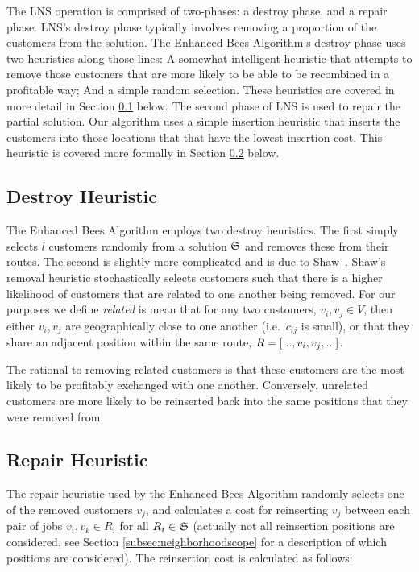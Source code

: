 The LNS operation is comprised of two-phases: a destroy phase, and a repair phase. LNS's destroy phase typically involves removing a proportion of the customers from the solution. The Enhanced Bees Algorithm's destroy phase uses two heuristics along those lines: A somewhat intelligent heuristic that attempts to remove those customers that are more likely to be able to be recombined in a profitable way; And a simple random selection. These heuristics are covered in more detail in Section \ref{subsec:destroyheuristic} below. The second phase of LNS is used to repair the partial solution. Our algorithm uses a simple insertion heuristic that inserts the customers into those locations that that have the lowest insertion cost. This heuristic is covered more formally in Section \ref{subsec:repairheuristic} below.

\subsection{Destroy Heuristic}
\label{subsec:destroyheuristic}

The Enhanced Bees Algorithm employs two destroy heuristics. The first simply selects $l$ customers randomly from a solution $\mathfrak{S}$ and removes these from their routes. The second is slightly more complicated and is due to Shaw~\cite{Shaw:1998}. Shaw's removal heuristic stochastically selects customers such that there is a higher likelihood of customers that are related to one another being removed. For our purposes we define \emph{related} is mean that for any two customers, $v_i, v_j \in V$, then either $v_i, v_j$ are geographically close to one another (i.e.~$c_{ij}$ is small), or that they share an adjacent position within the same route, $R = [..., v_i, v_j, ...]$.

The rational to removing related customers is that these customers are the most likely to be profitably exchanged with one another. Conversely, unrelated customers are more likely to be reinserted back into the same positions that they were removed from. 

\subsection{Repair Heuristic}
\label{subsec:repairheuristic}

The repair heuristic used by the Enhanced Bees Algorithm randomly selects one of the removed customers $v_j$, and calculates a cost for reinserting $v_j$ between each pair of jobs $v_i, v_k \in R_i$ for all $R_i \in \mathfrak{S}$ (actually not all reinsertion positions are considered, see Section \ref{subsec:neighborhoodscope} for a description of which positions are considered). The reinsertion cost is calculated as follows:

